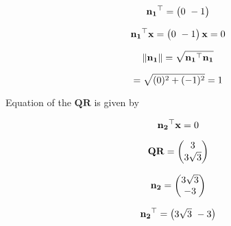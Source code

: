\documentclass[journal,10pt,twocolumn]{article}
\let\vec\mathbf
\begin{document}
\begin{equation}
\vec{n_1}^\top  =  \begin{pmatrix} 0  \ -1  \end{pmatrix} 
\vspace{0.1cm}
\end{equation}
    
\begin{equation}
\vec{n_1}^\top \vec{x}  =  \begin{pmatrix} 0  \ -1  \end{pmatrix}\vec{x} = 0 
\vspace{0.1cm}
\end{equation}
    
\begin{equation}
\lVert \vec{n_1}  \rVert = \sqrt{{\vec{n_1}}^\top \vec{n_1}}  
\vspace{0.1cm}
\end{equation}
    
\begin{equation}
=  \sqrt{(0)^2 + (-1)^2}   = 1
\vspace{0.1cm}
\end{equation}
    
\begin{flushleft}
    Equation of the  $\vec{QR}$  is given by
\end{flushleft}
    
\begin{equation}
\vec{n_2}^\top \vec{x} = 0 
\vspace{0.1cm}
\end{equation}
    
\begin{equation}
\vec{QR} = \begin{pmatrix}
        3\\ 
        3\sqrt{3}
        \end{pmatrix} 
        \vspace{0.1cm}
\end{equation}
    
\begin{equation}
\vec{n_2}  =  \begin{pmatrix}
        3\sqrt{3}\\ 
        -3
        \end{pmatrix} 
        \vspace{0.1cm}
\end{equation}
    
\begin{equation}
\vec{n_2}^\top  =  \begin{pmatrix} 3\sqrt{3}  \ -3  \end{pmatrix} 
\vspace{0.1cm}
\end{equation}
    
\end{document}
